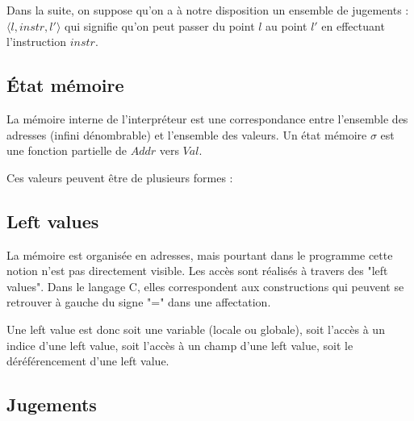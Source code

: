 Dans la suite, on suppose qu'on a à notre disposition un ensemble de jugements :
$\langle l, instr, l' \rangle$ qui signifie qu'on peut passer du point $l$ au
point $l'$ en effectuant l'instruction $instr$.

\subsection{État mémoire}
\label{sec:sigma}

La mémoire interne de l'interpréteur est une correspondance entre l'ensemble des
adresses (infini dénombrable) et l'ensemble des valeurs. Un état mémoire $σ$ est
une fonction partielle de $Addr$ vers $Val$.

Ces valeurs peuvent être de plusieurs formes :



\subsection{Left values}

La mémoire est organisée en adresses, mais pourtant dans le programme cette
notion n'est pas directement visible. Les accès sont réalisés à travers des
"left values". Dans le langage C, elles correspondent aux constructions qui
peuvent se retrouver à gauche du signe "=" dans une affectation.

Une left value est donc soit une variable (locale ou globale), soit l'accès à un
indice d'une left value, soit l'accès à un champ d'une left value, soit le
déréférencement d'une left value.

\subsection{Jugements}

